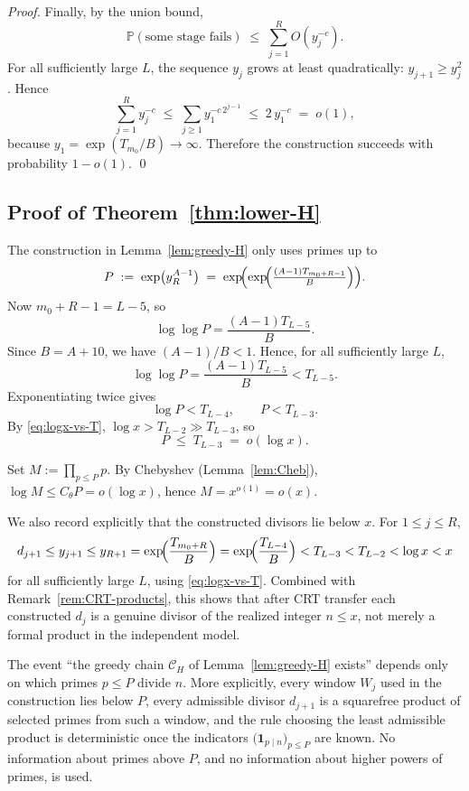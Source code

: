 \documentclass[11pt,reqno]{amsart}
\theoremstyle{plain}
\theoremstyle{definition}
\newcommand{\PP}{\mathbb{P}}
\begin{document}
\begin{proof}
Finally, by the union bound,
\begin{equation}\label{eq:greedy-H-bound}
\PP(\text{some stage fails})
\;\le\;
\sum_{j=1}^R O(y_j^{-c}).
\end{equation}
For all sufficiently large $L$, the sequence $y_j$ grows at least
quadratically: $y_{j+1}\ge y_j^2$. Hence
\[
\sum_{j=1}^R y_j^{-c}
\;\le\;
\sum_{j\ge 1} y_1^{-c\,2^{j-1}}
\;\le\;
2\,y_1^{-c}
\;=\;
o(1),
\]
because $y_1=\exp(T_{m_0}/B)\to\infty$. Therefore the construction succeeds
with probability $1-o(1)$. \qed
\end{proof}

\subsection{Proof of Theorem~\ref{thm:lower-H}}

The construction in Lemma~\ref{lem:greedy-H} only uses primes up to
\begin{equation}\label{eq:P-def-H}
P \;:=\; \exp\bigl(y_R^{A-1}\bigr)
\;=\; \exp\!\Bigl(\exp\!\Bigl(\tfrac{(A-1)T_{m_0+R-1}}{B}\Bigr)\Bigr).
\end{equation}
Now $m_0+R-1=L-5$, so
\[
   \log\log P=\frac{(A-1)T_{L-5}}{B}.
\]
Since $B=A+10$, we have $(A-1)/B<1$. Hence, for all sufficiently large $L$,
\begin{equation}\label{eq:P-bound1}
   \log\log P
   =
   \frac{(A-1)T_{L-5}}{B}
   <
   T_{L-5}.
\end{equation}
Exponentiating twice gives
\[
   \log P<T_{L-4}, \qquad P<T_{L-3}.
\]
By \eqref{eq:logx-vs-T}, $\log x>T_{L-2}\gg T_{L-3}$, so
\begin{equation}\label{eq:P-bound2}
P \;\le\; T_{L-3}\;=\;o(\log x).
\end{equation}

Set $M:=\prod_{p\le P}p$. By Chebyshev (Lemma~\ref{lem:Cheb}),
$\log M\le C_\theta P=o(\log x)$, hence $M=x^{o(1)}=o(x)$.

We also record explicitly that the constructed divisors lie below $x$. For
$1\le j\le R$,
\[
d_{j+1}\le y_{j+1}\le y_{R+1}
=
\exp\!\Bigl(\frac{T_{m_0+R}}{B}\Bigr)
=
\exp\!\Bigl(\frac{T_{L-4}}{B}\Bigr)
<
T_{L-3}
<
T_{L-2}
<
\log x
<
x
\]
for all sufficiently large $L$, using \eqref{eq:logx-vs-T}. Combined with
Remark~\ref{rem:CRT-products}, this shows that after CRT transfer each
constructed $d_j$ is a genuine divisor of the realized integer $n\le x$, not
merely a formal product in the independent model.

The event ``the greedy chain $\mathcal{C}_H$ of Lemma~\ref{lem:greedy-H} exists''
depends only on which primes $p\le P$ divide $n$. More explicitly, every window
$W_j$ used in the construction lies below $P$, every admissible divisor
$d_{j+1}$ is a squarefree product of selected primes from such a window, and the
rule choosing the least admissible product is deterministic once the indicators
$\bigl(\mathbf 1_{p\mid n}\bigr)_{p\le P}$ are known. No information about primes
above $P$, and no information about higher powers of primes, is used.
\end{document}
